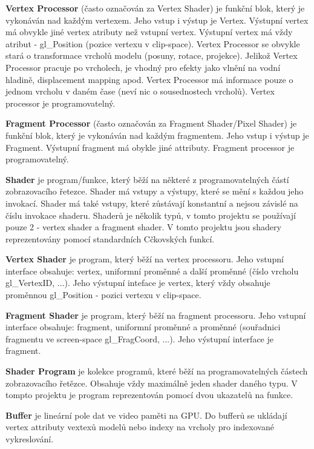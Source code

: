 {\bfseries Vertex Processor} (často označován za Vertex Shader) je funkční blok, který je vykonáván nad každým vertexem. Jeho vstup i výstup je Vertex. Výstupní vertex má obvykle jiné vertex atributy než vstupní vertex. Výstupní vertex má vždy atribut -\/ gl\+\_\+\+Position (pozice vertexu v clip-\/space). Vertex Processor se obvykle stará o transformace vrcholů modelu (posuny, rotace, projekce). Jelikož Vertex Processor pracuje po vrcholech, je vhodný pro efekty jako vlnění na vodní hladině, displacement mapping apod. Vertex Processor má informace pouze o jednom vrcholu v daném čase (neví nic o sousednostech vrcholů). Vertex processor je programovatelný.

{\bfseries Fragment Processor} (často označován za Fragment Shader/\+Pixel Shader) je funkční blok, který je vykonáván nad každým fragmentem. Jeho vstup i výstup je Fragment. Výstupní fragment má obykle jiné attributy. Fragment processor je programovatelný.

{\bfseries Shader} je program/funkce, který běží na některé z programovatelných částí zobrazovacího řetezce. Shader má vstupy a výstupy, které se mění s každou jeho invokací. Shader má také vstupy, které zůstávají konstantní a nejsou závislé na číslu invokace shaderu. Shaderů je několik typů, v tomto projektu se používají pouze 2 -\/ vertex shader a fragment shader. V tomto projektu jsou shadery reprezentovány pomocí standardních Cčkovských funkcí.

{\bfseries Vertex Shader} je program, který běží na vertex processoru. Jeho vstupní interface obsahuje\+: vertex, uniformní proměnné a další proměnné (číslo vrcholu gl\+\_\+\+Vertex\+ID, ...). Jeho výstupní inteface je vertex, který vždy obsahuje proměnnou gl\+\_\+\+Position -\/ pozici vertexu v clip-\/space.

{\bfseries Fragment Shader} je program, který běží na fragment processoru. Jeho vstupní interface obsahuje\+: fragment, uniformní proměnné a proměnné (souřadnici fragmentu ve screen-\/space gl\+\_\+\+Frag\+Coord, ...). Jeho výstupní interface je fragment.

{\bfseries Shader Program} je kolekce programů, které běží na programovatelných částech zobrazovacího řetězce. Obsahuje vždy maximálně jeden shader daného typu. V tompto projektu je program reprezentován pomocí dvou ukazatelů na funkce. 

{\bfseries Buffer} je lineární pole dat ve video paměti na G\+PU. Do bufferů se ukládají vertex attributy vextexů modelů nebo indexy na vrcholy pro indexované vykreslování.


